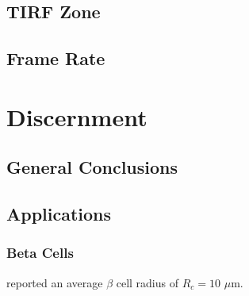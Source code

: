 \documentclass{report}
\begin{document}
\section{TIRF Zone}
\section{Frame Rate}

\chapter{Discernment}
\section{General Conclusions}
\section{Applications}
\subsection{Beta Cells}
\cite{marchetti2017pancreatic} reported an average $\beta$ cell radius of $R_c = 10$ $\mu$m.



\end{document}
